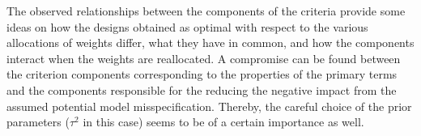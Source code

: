 The observed relationships between the components of the criteria provide some ideas on how the designs obtained as optimal with respect to the various allocations of weights differ, what they have in common, and how the components interact when the weights are reallocated. A compromise can be found between the criterion components corresponding to the properties of the primary terms and the components responsible for the reducing the negative impact from the assumed potential model misspecification. Thereby, the careful choice of the prior parameters ($\tau^2$ in this case) seems to be of a certain importance as well. 